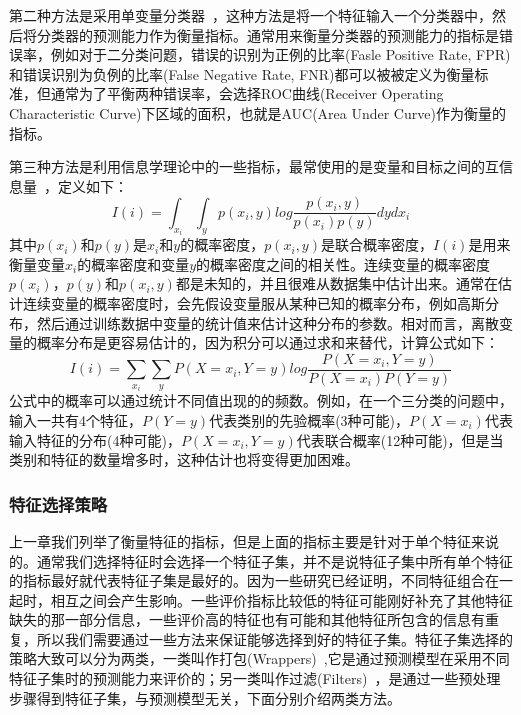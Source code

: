 第二种方法是采用单变量分类器~\cite{Forman2003An}，这种方法是将一个特征输入一个分类器中，然后将分类器的预测能力作为衡量指标。通常用来衡量分类器的预测能力的指标是错误率，例如对于二分类问题，错误的识别为正例的比率(Fasle Positive Rate, FPR)和错误识别为负例的比率(False Negative Rate, FNR)都可以被被定义为衡量标准，但通常为了平衡两种错误率，会选择ROC曲线(Receiver Operating Characteristic Curve)下区域的面积，也就是AUC(Area Under Curve)作为衡量的指标。

第三种方法是利用信息学理论中的一些指标，最常使用的是变量和目标之间的互信息量~\cite{Forman2003An, Bekkerman2003Distributional}，定义如下：
\begin{equation}
\label{equ:mutual_info}
    I(i) = \int_{x_i}\int_{y}p(x_i, y)log\frac{p(x_i, y)}{p(x_i)p(y)}dydx_i
\end{equation}
其中$p(x_i)$和$p(y)$是$x_i$和$y$的概率密度，$p(x_i, y)$是联合概率密度，$I(i)$是用来衡量变量$x_i$的概率密度和变量$y$的概率密度之间的相关性。连续变量的概率密度$p(x_i)$，$p(y)$和$p(x_i, y)$都是未知的，并且很难从数据集中估计出来。通常在估计连续变量的概率密度时，会先假设变量服从某种已知的概率分布，例如高斯分布，然后通过训练数据中变量的统计值来估计这种分布的参数。相对而言，离散变量的概率分布是更容易估计的，因为积分可以通过求和来替代，计算公式如下：
\begin{equation}
\label{equ:mutual_info_discrete}
    I(i) = \sum_{x_i}\sum_{y}P(X=x_i, Y=y)log\frac{P(X=x_i, Y=y)}{P(X=x_i)P(Y=y)}
\end{equation}
公式中的概率可以通过统计不同值出现的的频数。例如，在一个三分类的问题中，输入一共有4个特征，$P(Y=y)$代表类别的先验概率(3种可能)，$P(X=x_i)$代表输入特征的分布(4种可能)，$P(X=x_i, Y=y)$代表联合概率(12种可能)，但是当类别和特征的数量增多时，这种估计也将变得更加困难。

\subsubsection{特征选择策略}
\label{sssec:feature_select_scheme}
上一章我们列举了衡量特征的指标，但是上面的指标主要是针对于单个特征来说的。通常我们选择特征时会选择一个特征子集，并不是说特征子集中所有单个特征的指标最好就代表特征子集是最好的。因为一些研究已经证明，不同特征组合在一起时，相互之间会产生影响。一些评价指标比较低的特征可能刚好补充了其他特征缺失的那一部分信息，一些评价高的特征也有可能和其他特征所包含的信息有重复，所以我们需要通过一些方法来保证能够选择到好的特征子集。特征子集选择的策略大致可以分为两类，一类叫作打包(Wrappers)~\cite{Kohavi1997Wrappers},它是通过预测模型在采用不同特征子集时的预测能力来评价的；另一类叫作过滤(Filters)~\cite{Torkkola2003Feature}，是通过一些预处理步骤得到特征子集，与预测模型无关，下面分别介绍两类方法。

